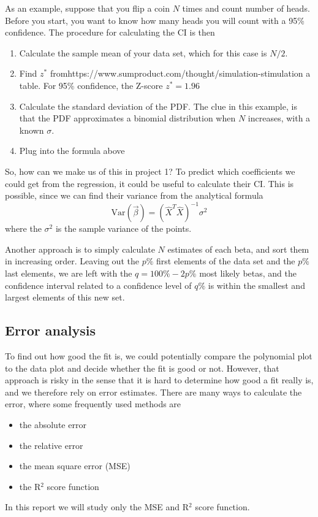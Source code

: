 As an example, suppose that you flip a coin $N$ times and count number of heads. Before you start, you want to know how many heads you will count with a 95\% confidence. The procedure for calculating the CI is then
\begin{enumerate}
	\item Calculate the sample mean of your data set, which for this case is $N/2$.
	\item Find $z^*$ fromhttps://www.sumproduct.com/thought/simulation-stimulation a table. For 95\% confidence, the Z-score $z^*=1.96$
	\item Calculate the standard deviation of the PDF. The clue in this example, is that the PDF approximates a binomial distribution when $N$ increases, with a known $\sigma$. \cite{Coin}
	\item Plug into the formula above
\end{enumerate}

So, how can we make us of this in project 1? To predict which coefficients we could get from the regression, it could be useful to calculate their CI. This is possible, since we can find their variance from the analytical formula
\begin{equation}
\text{Var}(\vec{\beta})=(\hat{X}^T\hat{X})^{-1}\sigma^2
\end{equation}
where the $\sigma^2$ is the sample variance of the points.

Another approach is to simply calculate $N$ estimates of each beta, and sort them in increasing order. Leaving out the $p\%$ first elements of the data set and the $p\%$ last elements, we are left with the $q=100\%-2p\%$ most likely betas, and the confidence interval related to a confidence level of $q\%$ is within the smallest and largest elements of this new set.

\subsection{Error analysis} \label{sec:error_analysis}
To find out how good the fit is, we could potentially compare the polynomial plot to the data plot and decide whether the fit is good or not. However, that approach is risky in the sense that it is hard to determine how good a fit really is, and we therefore rely on error estimates. There are many ways to calculate the error, where some frequently used methods are
\begin{itemize}
	\item{the absolute error}
	\item{the relative error}
	\item{the mean square error (MSE)}
	\item{the R$^2$ score function}
\end{itemize}
In this report we will study only the MSE and R$^2$ score function.

